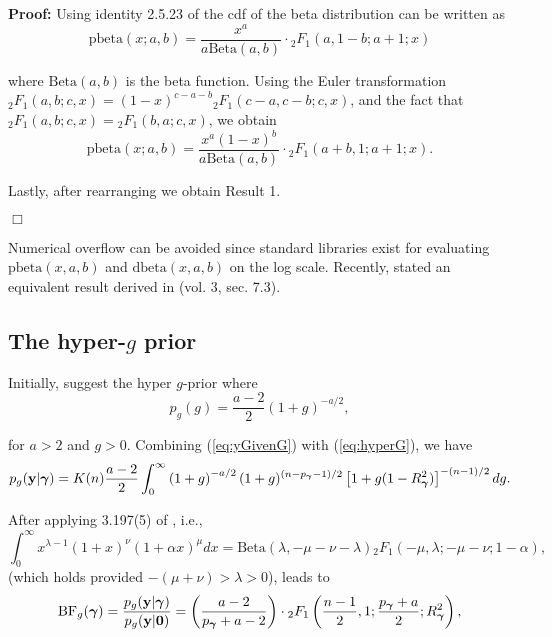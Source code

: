 \documentclass[12pt]{article}
\def\vectorfontone{\bf}
\def\vectorfonttwo{\boldsymbol}
\def\vy{{\vectorfontone y}}                      %
\def\vzero{{\vectorfontone 0}}
\def\vgamma{{\vectorfonttwo \gamma}}             %
\def\ds{\displaystyle}
\begin{document}
\bigskip 
\noindent 
{\bf Proof:} Using identity 2.5.23 of \cite{Abramowitz1972} the cdf of the beta distribution
can be written as
$$
\mbox{pbeta}(x;a,b) = \frac{x^a}{a\mbox{Beta}(a,b)} \cdot {}_2F_1(a,1-b;a+1;x) 
$$

\noindent where 
$\mbox{Beta}(a,b)$ is the beta function.
Using the Euler transformation
${}_2 F_1(a,b;c,x) = (1 - x)^{c-a-b} {}_2 F_1(c-a,c-b;c,x)$,
and the fact that ${}_2 F_1(a,b;c,x)={}_2 F_1(b,a;c,x)$,  we obtain
$$
\mbox{pbeta}(x;a,b) = \frac{x^a(1 - x)^{b}}{a\mbox{Beta}(a,b)} \cdot {}_2F_1(a+b,1;a+1;x). 
$$

\noindent Lastly, after rearranging we obtain Result 1.
\vspace{-0.5cm}\begin{flushright}$\Box$\end{flushright}

\noindent Numerical overflow can be avoided
since standard libraries exist for evaluating $\mbox{pbeta}(x,a,b)$ and $\mbox{dbeta}(x,a,b)$
on the log scale. Recently, \cite{Nadarajah2015} stated an equivalent result
derived in \cite{PrudnikovEtal1986} (vol. 3, sec. 7.3). 


 

\subsection{The hyper-$g$ prior}

Initially, \cite{Liang2008} suggest the hyper $g$-prior where
\begin{equation}\label{eq:hyperG}
\ds p_{g}(g) = \frac{a - 2}{2}(1 + g)^{-a/2},
\end{equation}

\noindent for $a>2$ and $g>0$. Combining (\ref{eq:yGivenG}) with (\ref{eq:hyperG}), we have
\begin{equation}\label{eq:hyperGmarginalIntegral}
p_{g}(\vy|\vgamma) = K(n) \frac{a - 2}{2}  \int_0^\infty 
\left( 1 + g \right)^{-a/2}
(1 + g)^{(n-p_\vgamma-1)/2} \left[ 1 + g (1 - R_\vgamma^2) \right]^{-(n-1)/2}  dg.
\end{equation}

\noindent After applying 
3.197(5) of \cite{Gradshteyn2007}, i.e.,
\begin{equation}\label{eq:31975}
\ds 
\int_0^\infty x^{\lambda - 1}(1 + x)^\nu (1 + \alpha x)^\mu dx
=\mbox{Beta}(\lambda,-\mu-\nu-\lambda){}_2F_1(-\mu,\lambda;-\mu-\nu; 1 - \alpha),
\end{equation}
\noindent (which holds provided $-(\mu  + \nu) > \lambda > 0$),
leads to
\begin{equation}\label{eq:hyperGmarginal}
\ds \mbox{BF}_{g}(\vgamma) = \frac{p_{g}(\vy|\vgamma)}{p_{g}(\vy|\vzero)} =  \left( \frac{a - 2}{p_\vgamma + a - 2} \right) \cdot {}_2F_1\left( \frac{n-1}{2}, 1; \frac{p_\vgamma + a}{2}; R_\vgamma^2 \right),
\end{equation}
\end{document}
